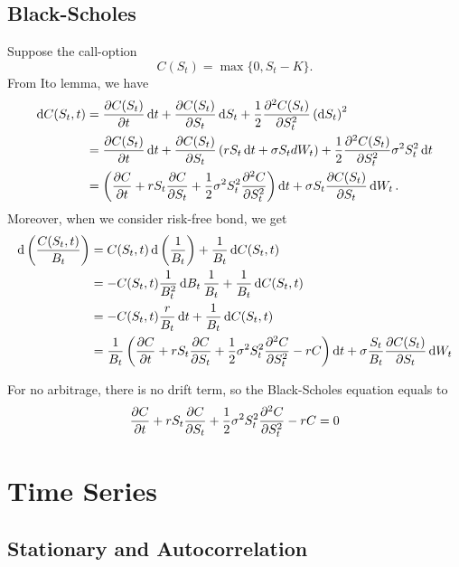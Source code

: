 \documentclass[10pt]{article}
\theoremstyle{remark}
\theoremstyle{plain}
\numberwithin{equation}{section}
\begin{document}
\subsection{Black-Scholes}
Suppose the call-option
\[
	C(S_t) = \max \{0, S_t - K\}.
\]
From Ito lemma, we have
\begin{align*}
	\dd{C(S_t, t)} & = \pdv{C(S_t)}{t}\dd{t} +  \pdv{C(S_t)}{S_t}\dd{S_t} + \frac{1}{2} \pdv[2]{C(S_t)}{S_t}  \left(\dd{S_t}\right)^2
	\\
	& = \pdv{C(S_t)}{t}\dd{t}  +  \pdv{C(S_t)}{S_t}\left(r S_t \dd{t} + \sigma S_t dW_t \right) + \frac{1}{2} \pdv[2]{C(S_t)}{S_t}  \sigma^2 S_t^2  \dd{t}
	\\
	&
	= \left(\pdv{C}{t}  + r S_t \pdv{C}{S_t} + \frac{1}{2}  \sigma^2 S_t^2 \pdv[2]{C}{S_t}\right) \dd{t}   + \sigma S_t \pdv{C(S_t)}{S_t} \dd{W_t} .
\end{align*}
Moreover, when we consider risk-free bond, we get
\begin{align*}
	\dd{\left(\frac{C(S_t,t)}{B_t}\right)} & = C(S_t,t) \dd{\left(\frac{1}{B_t}\right)} + \frac{1}{B_t} \dd{C(S_t,t)}
	\\
	& =  -  C(S_t,t) \frac{1}{B^2_t} \dd{B_t} \frac{1}{B_t}  + \frac{1}{B_t} \dd{C(S_t,t)} 
	\\
	& = -  C(S_t,t) \frac{r}{B_t} \dd{t} + \frac{1}{B_t} \dd{C(S_t,t)} 
	\\
	& = \frac{1}{B_t} \left(\pdv{C}{t}  + r S_t \pdv{C}{S_t} + \frac{1}{2}  \sigma^2 S_t^2 \pdv[2]{C}{S_t} - rC\right) \dd{t} + \sigma \frac{S_t}{B_t}\pdv{C(S_t)}{S_t}  \dd{W_t}  
\end{align*}


For no arbitrage, there is no drift term, so the Black-Scholes equation equals to
\begin{equation}\label{black_scholes}
	\pdv{C}{t}  + r S_t \pdv{C}{S_t} + \frac{1}{2}  \sigma^2 S_t^2 \pdv[2]{C}{S_t} -rC = 0
\end{equation}


%
%
\clearpage
\section{Time Series}


\subsection{Stationary and Autocorrelation}
\end{document}
